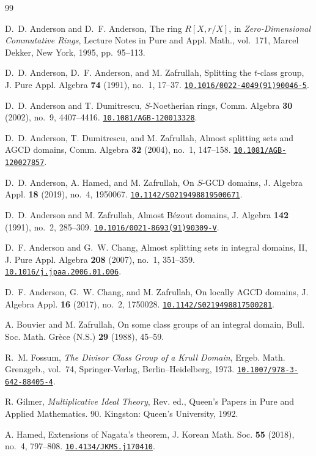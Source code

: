 \documentclass[11pt]{amsart}
\theoremstyle{definition}
\theoremstyle{remark}
\newcommand{\doi}[1]{\href{https://doi.org/#1}{\nolinkurl{#1}}}
\begin{document}
\begin{thebibliography}{99}

D.~D. Anderson and D.~F. Anderson,
The ring $R[X,r/X]$,
in \emph{Zero-Dimensional Commutative Rings},
Lecture Notes in Pure and Appl. Math., vol.~171,
Marcel Dekker, New York, 1995, pp.~95--113.

D.~D. Anderson, D.~F. Anderson, and M. Zafrullah,
Splitting the $t$-class group,
J. Pure Appl. Algebra \textbf{74} (1991), no.~1, 17--37.
\doi{10.1016/0022-4049(91)90046-5}.

D.~D. Anderson and T. Dumitrescu,
$S$-Noetherian rings,
Comm. Algebra \textbf{30} (2002), no.~9, 4407--4416.
\doi{10.1081/AGB-120013328}.

D.~D. Anderson, T. Dumitrescu, and M. Zafrullah,
Almost splitting sets and AGCD domains,
Comm. Algebra \textbf{32} (2004), no.~1, 147--158.
\doi{10.1081/AGB-120027857}.

D.~D. Anderson, A. Hamed, and M. Zafrullah,
On $S$-GCD domains,
J. Algebra Appl. \textbf{18} (2019), no.~4, 1950067.
\doi{10.1142/S0219498819500671}.

D.~D. Anderson and M. Zafrullah,
Almost B\'ezout domains,
J. Algebra \textbf{142} (1991), no.~2, 285--309.
\doi{10.1016/0021-8693(91)90309-V}.

D.~F. Anderson and G.~W. Chang,
Almost splitting sets in integral domains, II,
J. Pure Appl. Algebra \textbf{208} (2007), no.~1, 351--359.
\doi{10.1016/j.jpaa.2006.01.006}.

D.~F. Anderson, G.~W. Chang, and M. Zafrullah,
On locally AGCD domains,
J. Algebra Appl. \textbf{16} (2017), no.~2, 1750028.
\doi{10.1142/S0219498817500281}.

A. Bouvier and M. Zafrullah,
On some class groups of an integral domain,
Bull. Soc. Math. Gr\`ece (N.S.) \textbf{29} (1988), 45--59.

R.~M. Fossum,
\emph{The Divisor Class Group of a Krull Domain},
Ergeb. Math. Grenzgeb., vol.~74,
Springer-Verlag, Berlin--Heidelberg, 1973.
\doi{10.1007/978-3-642-88405-4}.

R. Gilmer,
\emph{Multiplicative Ideal Theory}, Rev. ed., 
Queen’s Papers in Pure and Applied Mathematics. 90. Kingston: Queen’s University, 1992.

A. Hamed,
Extensions of Nagata's theorem,
J. Korean Math. Soc. \textbf{55} (2018), no.~4, 797--808.
\doi{10.4134/JKMS.j170410}.


\end{thebibliography}
\end{document}
